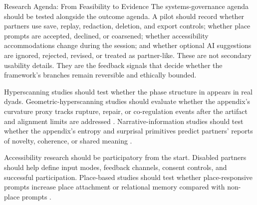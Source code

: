 \documentclass[
  ignorenonframetext,
]{beamer}
\begin{document}
\begin{frame}{Research Agenda: From
Feasibility to Evidence}
The systems-governance agenda should be tested alongside the outcome
agenda. A pilot should record whether partners use save, replay,
redaction, deletion, and export controls; whether place prompts are
accepted, declined, or coarsened; whether accessibility accommodations
change during the session; and whether optional AI suggestions are
ignored, rejected, revised, or treated as partner-like. These are not
secondary usability details. They are the feedback signals that decide
whether the framework's branches remain reversible and ethically
bounded.

Hyperscanning studies should test whether the phase structure in
 appears in real dyads. Geometric-hyperscanning
studies should evaluate whether the appendix's curvature proxy tracks
rupture, repair, or co-regulation events after the artifact and
alignment limits are addressed .
Narrative-information studies should test whether the appendix's entropy
and surprisal primitives predict partners' reports of novelty,
coherence, or shared meaning .

Accessibility research should be participatory from the start. Disabled
partners should help define input modes, feedback channels, consent
controls, and successful participation. Place-based studies should test
whether place-responsive prompts increase place attachment or relational
memory compared with non-place prompts .


\end{frame}
\end{document}
